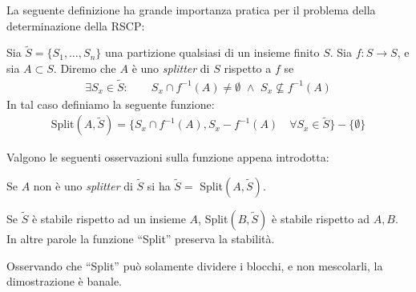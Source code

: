 La seguente definizione ha grande importanza pratica per il problema della determinazione della RSCP:
\begin{definition}
    Sia $\widetilde{S} = \{S_1,\dots,S_n\}$ una partizione qualsiasi di un insieme finito $S$. Sia $f: S \to S$, e sia $A \subset S$. Diremo che $A$ è uno \emph{splitter} di $S$ rispetto a $f$ se
    \begin{gather*}
        \exists S_x \in \widetilde{S} : \qquad S_x \cap f^{-1}(A) \neq \emptyset \,\,\land\,\, S_x \not\subseteq f^{-1}(A)
    \end{gather*}
    In tal caso definiamo la seguente funzione:
    \begin{gather*}
        \text{Split}(A,\widetilde{S}) = \{S_x \cap f^{-1}(A), S_x - f^{-1}(A) \quad \forall S_x \in \widetilde{S}\} - \{\emptyset\}
    \end{gather*}
\end{definition}
Valgono le seguenti osservazioni sulla funzione appena introdotta:
\begin{observation}
    Se $A$ non è uno \emph{splitter} di $\widetilde{S}$ si ha $\widetilde{S} = $ Split$(A,\widetilde{S})$.
\end{observation}
\begin{observation}
    \label{obs:split_eredita}
    Se $\widetilde{S}$ è stabile rispetto ad un insieme $A$, Split$(B,\widetilde{S})$ è stabile rispetto ad $A,B$. In altre parole la funzione ``Split'' preserva la stabilità.
\end{observation}
\begin{proof2}
    Osservando che ``Split'' può solamente dividere i blocchi, e non mescolarli, la dimostrazione è banale.
\end{proof2}

